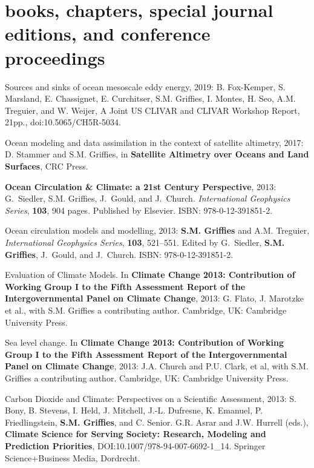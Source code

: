 \section*{\sc \color{Maroon} books, chapters, special journal editions, and
  conference proceedings}


\begin{etaremune}

\item Sources and sinks of ocean mesoscale eddy energy, 2019: B. Fox-Kemper,  S. Marsland, E. Chassignet, E. Curchitser, S.M. Griffies, I. Montes, H. Seo, A.M. Treguier, and W. Weijer, A Joint US CLIVAR and CLIVAR Workshop Report, 21pp., doi:10.5065/CH5R-5034.

\item Ocean modeling and data assimilation in the context of satellite altimetry, 2017: D. Stammer and S.M. Grif\/f\/ies, in  {\bf Satellite Altimetry over Oceans and Land Surfaces}, CRC Press.
  
\item {\bf Ocean Circulation \& Climate: a 21st Century Perspective},
  2013: G.\ Siedler, S.M. Grif\/f\/ies, J.\ Gould, and J.\ Church.
  {\it International Geophysics Series}, {\bf 103}, 904
  pages. Published by Elsevier.  ISBN: 978-0-12-391851-2.

\item Ocean circulation models and modelling, 2013: {\bf
    S.M. Grif\/f\/ies} and A.M. Treguier, {\it International Geophysics
    Series}, {\bf 103}, 521--551.  Edited by G.\ Siedler, {\bf
    S.M. Grif\/f\/ies}, J.\ Gould, and J.\ Church.  ISBN:
  978-0-12-391851-2.

\item Evaluation of Climate Models.  In {\bf Climate Change 2013:
    Contribution of Working Group I to the Fifth Assessment Report of
    the Intergovernmental Panel on Climate Change}, 2013: G. Flato,
  J. Marotzke et al., with S.M. Grif\/f\/ies a contributing
  author.   Cambridge, UK: Cambridge University Press.

\item Sea level change.  In {\bf Climate Change 2013: Contribution of
    Working Group I to the Fifth Assessment Report of the
    Intergovernmental Panel on Climate Change}, 2013: J.A. Church and
  P.U. Clark, et al, with S.M. Grif\/f\/ies a contributing
  author.  Cambridge, UK: Cambridge University Press.

\item Carbon Dioxide and Climate: Perspectives on a Scientific
  Assessment, 2013: S. Bony, B. Stevens, I. Held, J. Mitchell,
  J.-L. Dufresne, K. Emanuel, P. Friedlingstein, {\bf
    S.M. Grif\/f\/ies}, and C. Senior. G.R. Asrar and J.W. Hurrell
  (eds.), {\bf Climate Science for Serving Society: Research, Modeling
    and Prediction Priorities}, DOI:10.1007/978-94-007-6692-1\_14.
  Springer Science+Business Media, Dordrecht.


\end{etaremune}
